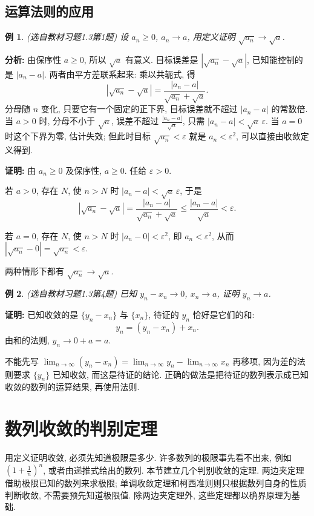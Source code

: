 \documentclass[UTF8,openany]{ctexbook}
\theoremstyle{chinesetextbook}
\newtheorem{example}{例}[section]
\newenvironment{cnproof}{\par\indent\textbf{证明:} \ignorespaces}{\par}
\begin{document}
\subsection{运算法则的应用}
\begin{example}
\textnormal{(选自教材习题1.3第1题)} 设 $a_n\ge0$, $a_n\to a$, 用定义证明 $\sqrt{a_n}\to\sqrt a$.
\end{example}
\par\indent\textbf{分析:} 由保序性 $a\ge0$, 所以 $\sqrt a$ 有意义. 目标误差是 $|\sqrt{a_n}-\sqrt a|$, 已知能控制的是 $|a_n-a|$. 两者由平方差联系起来: 乘以共轭式, 得
\[
|\sqrt{a_n}-\sqrt a|=\frac{|a_n-a|}{\sqrt{a_n}+\sqrt a}.
\]
分母随 $n$ 变化, 只要它有一个固定的正下界, 目标误差就不超过 $|a_n-a|$ 的常数倍. 当 $a>0$ 时, 分母不小于 $\sqrt a$, 误差不超过 $\displaystyle\frac{|a_n-a|}{\sqrt a}$, 只需 $|a_n-a|<\sqrt a\,\varepsilon$. 当 $a=0$ 时这个下界为零, 估计失效; 但此时目标 $\sqrt{a_n}<\varepsilon$ 就是 $a_n<\varepsilon^2$, 可以直接由收敛定义得到.
\begin{cnproof}
由 $a_n\ge0$ 及保序性, $a\ge0$. 任给 $\varepsilon>0$.

若 $a>0$, 存在 $N$, 使 $n>N$ 时 $|a_n-a|<\sqrt a\,\varepsilon$, 于是
\[
|\sqrt{a_n}-\sqrt a|=\frac{|a_n-a|}{\sqrt{a_n}+\sqrt a}\le\frac{|a_n-a|}{\sqrt a}<\varepsilon.
\]

若 $a=0$, 存在 $N$, 使 $n>N$ 时 $|a_n-0|<\varepsilon^2$, 即 $a_n<\varepsilon^2$, 从而 $|\sqrt{a_n}-0|=\sqrt{a_n}<\varepsilon$.

两种情形下都有 $\sqrt{a_n}\to\sqrt a$.
\end{cnproof}
\begin{example}
\textnormal{(选自教材习题1.3第4题)} 已知 $y_n-x_n\to0$, $x_n\to a$, 证明 $y_n\to a$.
\end{example}
\begin{cnproof}
已知收敛的是 $\{y_n-x_n\}$ 与 $\{x_n\}$, 待证的 $y_n$ 恰好是它们的和:
\[
y_n=(y_n-x_n)+x_n.
\]
由和的法则, $y_n\to0+a=a$.
\end{cnproof}
不能先写 $\displaystyle\lim_{n\to\infty}(y_n-x_n)=\lim_{n\to\infty}y_n-\lim_{n\to\infty}x_n$ 再移项, 因为差的法则要求 $\{y_n\}$ 已知收敛, 而这是待证的结论. 正确的做法是把待证的数列表示成已知收敛的数列的运算结果, 再使用法则.
\section{数列收敛的判别定理}
用定义证明收敛, 必须先知道极限是多少. 许多数列的极限事先看不出来, 例如 $\displaystyle\left(1+\frac1n\right)^n$, 或者由递推式给出的数列. 本节建立几个判别收敛的定理. 两边夹定理借助极限已知的数列来求极限; 单调收敛定理和柯西准则则只根据数列自身的性质判断收敛, 不需要预先知道极限值. 除两边夹定理外, 这些定理都以确界原理为基础.
\end{document}
